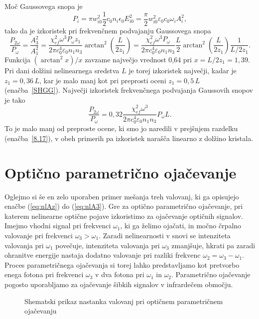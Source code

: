 Moč Gaussovega snopa je
\begin{equation}
P_{i}=\pi w_{i0}^{2} \frac{1}{2}c_0 n_i \epsilon_{0}E_{i0}^{2}=
\frac{\pi}{2}w_{i0}^{2}\varepsilon_0 c_0 \omega_{i} A_{i}^{2},
\label{8.26}
\end{equation}
tako da je izkoristek pri frekvenčnem podvajanju Gaussovega snopa 
\begin{equation}
\frac{P_{2\omega}}{P_{\omega}}=\frac{A_3^2}{A_1^2} = 
\frac{\chi_{ef}^2 \omega^3 P_\omega z_1}{2 \pi c_0^4 \varepsilon_0 n_1 n_3} 
\arctan^2 \left( \frac{L}{2z_1}\right)
= \frac{\chi_{ef}^2 \omega^3 P_\omega}{2 \pi c_0^4 \varepsilon_0 n_1 n_3} \frac{L}{2}
\arctan^2 \left( \frac{L}{2z_1}\right) \frac{1}{L/2z_1}.
\label{8.27}
\end{equation}
Funkcija $(\arctan^{2}x)/x$ zavzame največjo vrednost 0,64 pri $x =L/2z_1=1,39$.
Pri dani dolžini nelinearnega sredstva $L$ je torej 
izkoristek največji, kadar je $z_{1}=0,36\,L$, kar je malo manj kot pri
preprosti oceni $z_{1}=0,5\,L$ (enačba~\ref{SHGG}). Največji izkoristek
frekvenčnega podvajanja Gaussovih snopov je tako
\begin{equation}
\frac{P_{2\omega}}{P_{\omega}}
= 0,32 \frac{\chi_{ef}^2 \omega^3 }{2 \pi c_0^4 \varepsilon_0 n_1 n_3} P_\omega L.
\label{8.28}
\end{equation}
To je malo manj od preproste ocene, ki smo jo naredili v prejšnjem razdelku (enačba~\ref{8.17}),
v obeh primerih pa izkoristek narašča linearno z dolžino kristala.

\section{Optično parametrično ojačevanje}

Oglejmo si še en zelo uporaben primer mešanja treh valovanj, 
ki ga opisujejo enačbe (\ref{eq:nlAz}) do (\ref{eq:nlA3}). Gre za
optično parametrično ojačevanje, pri katerem nelinearne optične pojave
izkoristimo za ojačevanje optičnih signalov. Imejmo vhodni
signal pri frekvenci $\omega_{1}$, ki ga želimo ojačati, in močno črpalno valovanje
pri frekvenci $\omega_{3}>\omega_{1}$. Zaradi nelinearnosti v snovi se 
intenziteta valovanja pri $\omega_{1}$ povečuje, 
intenziteta valovanja pri $\omega_{3}$ zmanjšuje, hkrati pa zaradi
ohranitve energije nastaja dodatno valovanje pri razliki frekvenc
$\omega_{2}=\omega_{3}-\omega_{1}$. Proces parametričnega ojačevanja 
si torej lahko predstavljamo kot pretvorbo enega fotona pri frekvenci 
$\omega_{3}$ v dva fotona pri $\omega_{1}$ in $\omega_{2}$.
Parametrično ojačevanje pogosto uporabljamo za ojačevanje šibkih signalov 
v infrardečem območju.
\begin{figure}[h]
\centering
\def\svgwidth{100truemm} 

\caption{Shematski prikaz nastanka valovanj pri optičnem parametričnem ojačevanju}
\label{fig:opa2}
\end{figure}

